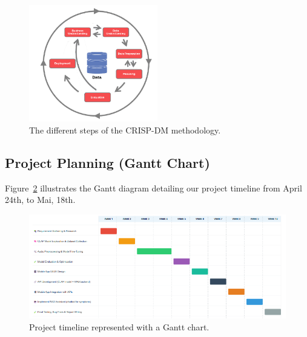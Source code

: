 \begin{figure}[htbp]
    \centering
    \includegraphics[width=0.5\textwidth]{images/crisp-dm-diagram.png}
    \caption{The different steps of the CRISP-DM methodology.}
    \label{fig:crisp-dm}
\end{figure}

\subsection{Project Planning (Gantt Chart)}
Figure~\ref{fig:gantt-chart} illustrates the Gantt diagram detailing our project timeline from April 24th, to Mai, 18th.

\begin{figure}[htbp]
    \centering
    \includegraphics[width=\textwidth]{images/Gannt.png}
    \caption{Project timeline represented with a Gantt chart.}
    \label{fig:gantt-chart}
\end{figure}